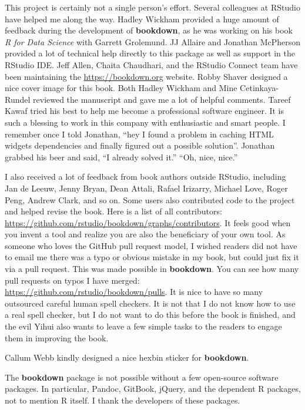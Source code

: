 \documentclass[
  12pt,
]{krantz}
\theoremstyle{definition}
\theoremstyle{definition}
\theoremstyle{definition}
\theoremstyle{definition}
\theoremstyle{remark}
\begin{document}
This project is certainly not a single person's effort. Several colleagues at RStudio have helped me along the way. Hadley Wickham provided a huge amount of feedback during the development of \textbf{bookdown}, as he was working on his book \emph{R for Data Science} with Garrett Grolemund. JJ Allaire and Jonathan McPherson provided a lot of technical help directly to this package as well as support in the RStudio IDE. Jeff Allen, Chaita Chaudhari, and the RStudio Connect team have been maintaining the \url{https://bookdown.org} website. Robby Shaver designed a nice cover image for this book. Both Hadley Wickham and Mine Cetinkaya-Rundel reviewed the manuscript and gave me a lot of helpful comments. Tareef Kawaf tried his best to help me become a professional software engineer. It is such a blessing to work in this company with enthusiastic and smart people. I remember once I told Jonathan, ``hey I found a problem in caching HTML widgets dependencies and finally figured out a possible solution''. Jonathan grabbed his beer and said, ``I already solved it.'' ``Oh, nice, nice.''

I also received a lot of feedback from book authors outside RStudio, including Jan de Leeuw, Jenny Bryan, Dean Attali, Rafael Irizarry, Michael Love, Roger Peng, Andrew Clark, and so on. Some users also contributed code to the project and helped revise the book. Here is a list of all contributors: \url{https://github.com/rstudio/bookdown/graphs/contributors}. It feels good when you invent a tool and realize you are also the beneficiary of your own tool. As someone who loves the GitHub pull request model, I wished readers did not have to email me there was a typo or obvious mistake in my book, but could just fix it via a pull request. This was made possible in \textbf{bookdown}. You can see how many pull requests on typos I have merged: \url{https://github.com/rstudio/bookdown/pulls}. It is nice to have so many outsourced careful human spell checkers. It is not that I do not know how to use a real spell checker, but I do not want to do this before the book is finished, and the evil Yihui also wants to leave a few simple tasks to the readers to engage them in improving the book.

Callum Webb kindly designed a nice hexbin sticker for \textbf{bookdown}.

The \textbf{bookdown} package is not possible without a few open-source software packages. In particular, Pandoc, GitBook, jQuery, and the dependent R packages, not to mention R itself. I thank the developers of these packages.
\end{document}

